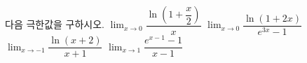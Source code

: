 다음 극한값을 구하시오.
 $\displaystyle\lim_{x\to 0}\dfrac{\ln\left(1+\dfrac{x}{2}\right)}{x}$
 $\displaystyle\lim_{x\to 0}\dfrac{\ln(1+2x)}{e^{3x}-1}$
 $\displaystyle\lim_{x\to -1}\dfrac{\ln(x+2)}{x+1}$
 $\displaystyle\lim_{x\to 1}\dfrac{e^{x-1}-1}{x-1}$
